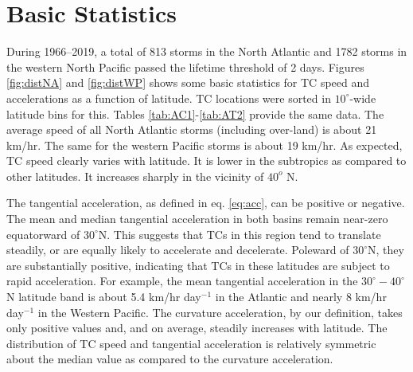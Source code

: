 \documentclass[wcd,manuscript]{copernicus}
\begin{document}


\section{Basic Statistics}

During 1966--2019, a total of 813 storms in the North Atlantic and 1782 storms in the western North Pacific passed the lifetime threshold of 2 days. Figures \ref{fig:distNA} and \ref{fig:distWP} shows some basic statistics for TC speed and accelerations as a function of latitude. TC locations were sorted in $10^\circ$-wide latitude bins for this. Tables \ref{tab:AC1}-\ref{tab:AT2} provide the same data. The average speed of all North Atlantic storms (including over-land) is about 21 km/hr. The same for the western Pacific storms is about 19 km/hr. As expected, TC speed clearly varies with latitude. It is lower in the subtropics as compared to other latitudes. It increases sharply in the vicinity of $40^{o}$ N. 


The tangential acceleration, as defined in eq. \ref{eq:acc}, can be positive or negative. The mean and median tangential acceleration in both basins remain near-zero equatorward of $30^\circ$N. This suggests that TCs in this region tend to translate steadily, or are equally likely to accelerate and decelerate. Poleward of $30^\circ$N, they are substantially positive, indicating that TCs in these latitudes are subject to rapid acceleration. For example, the mean tangential acceleration in the $30^\circ-40^\circ$N latitude band is about 5.4  km/hr day$^{-1}$ in the Atlantic and nearly 8  km/hr day$^{-1}$ in the Western Pacific.  The curvature acceleration, by our definition, takes only positive values and, and on average, steadily increases with latitude. The distribution of TC speed and tangential acceleration is relatively symmetric about the median value as compared to the curvature acceleration.

\end{document}
